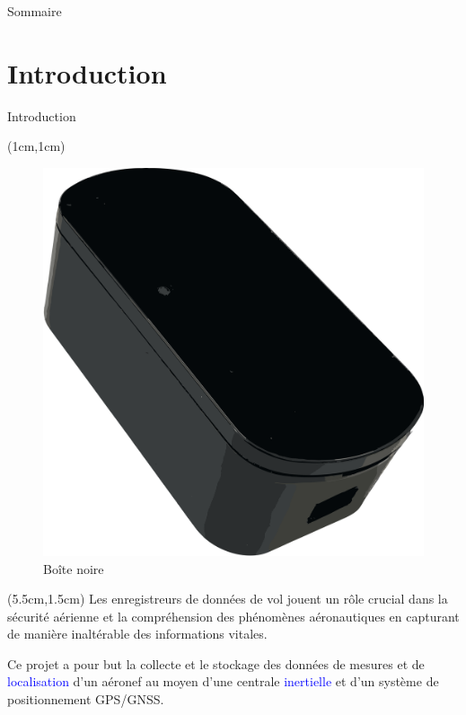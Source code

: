 \documentclass{beamer}
\begin{document}
\begin{frame}{Sommaire}
	\tableofcontents
\end{frame}

\section{Introduction}

\begin{frame}{Introduction}	
	\begin{textblock*}{4cm}(1cm,1cm) %
	\begin{figure}[h]
		\centering
		\includegraphics[width=1\linewidth]{../figures/boite-noire}
		\caption{Boîte noire}
		\label{fig:boite-noire}
	\end{figure}
	\end{textblock*}
	
	\begin{textblock*}{7cm}(5.5cm,1.5cm) %
		Les enregistreurs de données de vol jouent un rôle crucial dans la sécurité aérienne et la compréhension des phénomènes aéronautiques en capturant de manière inaltérable des informations vitales. 
		
		Ce projet a pour but la collecte et le stockage des données de mesures et de \textcolor{blue}{localisation} d'un aéronef au moyen d'une centrale \textcolor{blue}{inertielle} et d'un système de positionnement GPS/GNSS.		
	\end{textblock*}
\end{frame}
\end{document}
